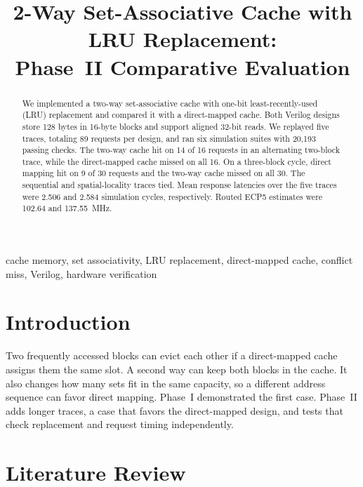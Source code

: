 \documentclass[conference]{IEEEtran}
\begin{document}
\title{2-Way Set-Associative Cache with LRU Replacement:\\Phase~II Comparative Evaluation}

\author{
}

\maketitle

\begin{abstract}
We implemented a two-way set-associative cache with one-bit
least-recently-used (LRU) replacement and compared it with a direct-mapped
cache. Both Verilog designs store 128 bytes in 16-byte blocks and support
aligned 32-bit reads. We replayed five traces, totaling 89 requests per
design, and ran six simulation suites with 20,193 passing checks. The
two-way cache hit on 14 of 16 requests in an alternating two-block trace,
while the direct-mapped cache missed on all 16. On a three-block cycle,
direct mapping hit on 9 of 30 requests and the two-way cache missed on all
30. The sequential and spatial-locality traces tied. Mean response
latencies over the five traces were 2.506 and 2.584 simulation cycles,
respectively. Routed ECP5 estimates were 102.64 and 137.55~MHz.
\end{abstract}

\begin{IEEEkeywords}
cache memory, set associativity, LRU replacement, direct-mapped cache,
conflict miss, Verilog, hardware verification
\end{IEEEkeywords}

\section{Introduction}

Two frequently accessed blocks can evict each other if a direct-mapped
cache assigns them the same slot. A second way can keep both blocks in the
cache. It also changes how many sets fit in the same capacity, so a
different address sequence can favor direct mapping. Phase~I demonstrated
the first case. Phase~II adds longer traces, a case that favors the
direct-mapped design, and tests that check replacement and request timing
independently.

\section{Literature Review}
\end{document}
